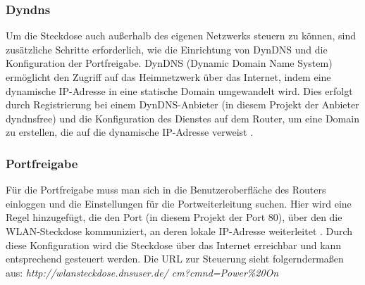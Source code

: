 \documentclass[conference]{IEEEtran}
\begin{document}
\subsubsection{Dyndns}
Um die Steckdose auch außerhalb des eigenen Netzwerks steuern zu können, sind zusätzliche Schritte erforderlich, wie die Einrichtung von DynDNS und die Konfiguration der Portfreigabe. DynDNS (Dynamic Domain Name System) ermöglicht den Zugriff auf das Heimnetzwerk über das Internet, indem eine dynamische IP-Adresse in eine statische Domain umgewandelt wird. Dies erfolgt durch Registrierung bei einem DynDNS-Anbieter (in diesem Projekt der Anbieter dyndnsfree) und die Konfiguration des Dienstes auf dem Router, um eine Domain zu erstellen, die auf die dynamische IP-Adresse verweist \cite{dyndns}.
\subsubsection{Portfreigabe}
Für die Portfreigabe muss man sich in die Benutzeroberfläche des Routers einloggen und die Einstellungen für die Portweiterleitung suchen. Hier wird eine Regel hinzugefügt, die den Port (in diesem Projekt der Port 80), über den die WLAN-Steckdose kommuniziert, an deren lokale IP-Adresse weiterleitet \cite{portfreigabe}. Durch diese Konfiguration wird die Steckdose über das Internet erreichbar und kann entsprechend gesteuert werden. Die URL zur Steuerung sieht folgerndermaßen aus: \textit{http://wlansteckdose.dnsuser.de/
cm?cmnd=Power\%20On}
\end{document}

